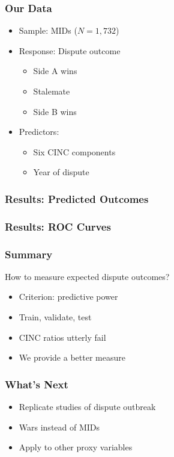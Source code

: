 \documentclass{beamer}
\begin{document}
\begin{frame}
  \frametitle{Our Data}

  \begin{itemize}
    \item Sample: MIDs ($N = 1{,}732$)
    \item Response: Dispute outcome
    \begin{itemize}
      \item Side A wins
      \item Stalemate
      \item Side B wins
    \end{itemize}
    \item Predictors:
    \begin{itemize}
      \item Six CINC components
      \item Year of dispute
    \end{itemize}
  \end{itemize}
\end{frame}

\begin{frame}
  \frametitle{Results: Predicted Outcomes}

  \centering
  
\end{frame}

\begin{frame}
  \frametitle{Results: ROC Curves}

  \centering
  
\end{frame}

\begin{frame}
  \frametitle{Summary}

  How to measure expected dispute outcomes?
  \begin{itemize}
    \item Criterion: predictive power
    \item Train, validate, test
    \item CINC ratios utterly fail
    \item We provide a better measure
  \end{itemize}
\end{frame}

\begin{frame}
  \frametitle{What's Next}

  \begin{itemize}
    \item Replicate studies of dispute outbreak
    \item Wars instead of MIDs
    \item Apply to other proxy variables
  \end{itemize}
\end{frame}

\end{document}
